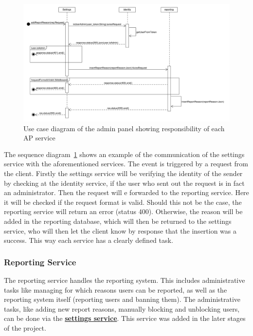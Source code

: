 \begin{figure}[!ht]
    \centering
    \includegraphics[width=1.0\textwidth]{./images/SequenceDiagram_AddReportReason}
    \caption{Use case diagram of the admin panel showing responsibility of each AP service}
    \label{fig:addReportReason}
\end{figure}

The sequence diagram~\ref{fig:addReportReason} shows an example of the communication of the settings service with the
aforementioned services.
The event is triggered by a request from the client.
Firstly the settings service will be verifying the identity of the sender by checking at the identity service, if the
user who sent out the request is in fact an administrator.
Then the request will e forwarded to the reporting service.
Here it will be checked if the request format is valid.
Should this not be the case, the reporting service will return an error (status 400).
Otherwise, the reason will be added in the reporting database, which will then be returned to the settings service,
who will then let the client know by response that the insertion was a success.
This way each service has a clearly defined task.

\subsubsection{Reporting Service}\label{subsubsec:reportingSer}

The reporting service handles the reporting system.
This includes administrative tasks like managing for which reasons users can be reported, as well as the reporting
system itself (reporting users and banning them).
The administrative tasks, like adding new report reasons, manually blocking and unblocking users, can be done via the
\hyperref[subsubsec:settingsSer]{\textbf{settings service}}.
This service was added in the later stages of the project.


